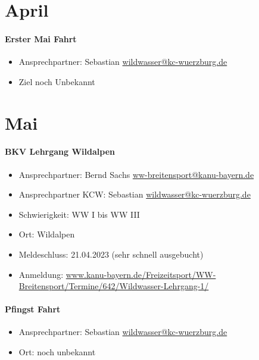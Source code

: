 \documentclass[12pt, a4paper]{report}
\begin{document}
\section*{April}\paragraph{Erster Mai Fahrt}
\begin{itemize}
    \item Ansprechpartner: Sebastian \href{mailto:wildwasser@kc-wuerzburg.de}{wildwasser@kc-wuerzburg.de}
    \item Ziel noch Unbekannt
\end{itemize}

\section*{Mai}\paragraph{BKV Lehrgang Wildalpen}
\begin{itemize}
    \item Ansprechpartner: Bernd Sachs \href{mailto:ww-breitensport@kanu-bayern.de}{ww-breitensport@kanu-bayern.de}
    \item Ansprechpartner KCW: Sebastian \href{mailto:wildwasser@kc-wuerzburg.de}{wildwasser@kc-wuerzburg.de}
    \item Schwierigkeit: WW I bis WW III
    \item Ort: Wildalpen
    \item Meldeschluss: 21.04.2023 (sehr schnell ausgebucht)
    \item Anmeldung: \url{www.kanu-bayern.de/Freizeitsport/WW-Breitensport/Termine/642/Wildwasser-Lehrgang-1/}
\end{itemize}

\paragraph{Pfingst Fahrt}
\begin{itemize}
    \item Ansprechpartner: Sebastian \href{mailto:wildwasser@kc-wuerzburg.de}{wildwasser@kc-wuerzburg.de}
    \item Ort: noch unbekannt
\end{itemize}
\end{document}
